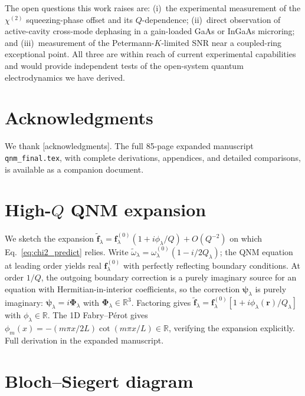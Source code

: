 \documentclass[11pt]{article}
\newcommand{\tf}{\tilde{\mathbf{f}}}
\newcommand{\tomega}{\tilde{\omega}}
\begin{document}
The open questions this work raises are: (i)~the experimental
measurement of the $\chi^{(2)}$ squeezing-phase offset and its
$Q$-dependence; (ii)~direct observation of active-cavity cross-mode
dephasing in a gain-loaded GaAs or InGaAs microring; and
(iii)~measurement of the Petermann-$K$-limited SNR near a coupled-ring
exceptional point.  All three are within reach of current experimental
capabilities and would provide independent tests of the open-system
quantum electrodynamics we have derived.

\section*{Acknowledgments}
We thank [acknowledgments].  The full 85-page expanded manuscript
\texttt{qnm\_final.tex}, with complete derivations, appendices, and
detailed comparisons, is available as a companion document.

\appendix
\section{High-\texorpdfstring{$Q$}{Q} QNM expansion}
\label{app:highQ}

We sketch the expansion
$\tf_\lambda = \mathbf{f}^{(0)}_\lambda(1+i\phi_\lambda/Q)+O(Q^{-2})$
on which Eq.~\eqref{eq:chi2_predict} relies.  Write
$\tomega_\lambda=\omega^{(0)}_\lambda(1-i/2Q_\lambda)$; the QNM equation
at leading order yields real $\mathbf{f}^{(0)}_\lambda$ with perfectly
reflecting boundary conditions.  At order $1/Q$, the outgoing boundary
correction is a purely imaginary source for an equation with
Hermitian-in-interior coefficients, so the correction
$\boldsymbol{\psi}_\lambda$ is purely imaginary:
$\boldsymbol{\psi}_\lambda=i\mathbf{\Phi}_\lambda$ with
$\mathbf{\Phi}_\lambda\in\mathbb{R}^3$.  Factoring gives
$\tf_\lambda=\mathbf{f}^{(0)}_\lambda[1+i\phi_\lambda(\mathbf{r})/Q_\lambda]$
with $\phi_\lambda\in\mathbb{R}$.  The 1D Fabry--P\'erot gives
\(\phi_m(x)=-(m\pi x/2L)\cot(m\pi x/L)\in\mathbb{R}\), verifying the
expansion explicitly.  Full derivation in the expanded manuscript.

\section{Bloch--Siegert diagram}
\label{app:bss}
\end{document}
